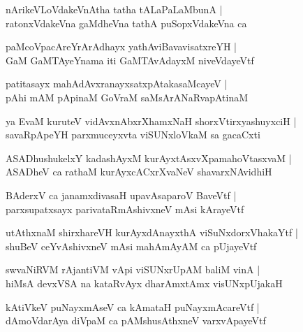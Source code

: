 \documentclass[twoside,12pt,openright]{book}
\newcounter{shloka}[chapter]
\begin{document}
\begin{shloka}%
nArikeVLoVdakeVnAtha tatha tALaPaLaMbunA |\\
ratonxVdakeVna gaMdheVna tathA puSopxVdakeVna ca 
\end{shloka}

\begin{shloka}%
paMcoVpacAreYrArAdhayx yathAviBavavisatxreYH |\\
GaM GaMTAyeYnama iti GaMTAvAdayxM niveVdayeVtf
\end{shloka}

\begin{shloka}%
patitasayx mahAdAvxranayxsatxpAtakasaMcayeV |\\
pAhi mAM pApinaM GoVraM saMsArANaRvapAtinaM 
\end{shloka}

\begin{shloka}%
ya EvaM kuruteV vidAvxnAbxrXhamxNaH shorxVtirxyashuyxciH |\\
savaRpApeYH parxmuceyxvta viSUNxloVkaM sa gacaCxti 
\end{shloka}

\begin{shloka}%
ASADhushukelxY kadashAyxM kurAyxtAsxvXpamahoVtasxvaM |\\
ASADheV ca rathaM kurAyxcACxrXvaNeV shavarxNAvidhiH
\end{shloka}

\begin{shloka}%
BAderxV ca janamxdivasaH upavAsaparoV BaveVtf |\\
parxsupatxsayx parivataRmAshivxneV mAsi kArayeVtf
\end{shloka}

\begin{shloka}%
utAthxnaM shirxhareVH kurAyxdAnayxthA viSuNxdorxVhakaYtf |\\
shuBeV ceYvAshivxneV mAsi mahAmAyAM ca pUjayeVtf
\end{shloka}

\begin{shloka}%
swvaNiRVM rAjantiVM vApi viSUNxrUpAM baliM vinA |\\
hiMsA devxVSA na kataRvAyx dharAmxtAmx visUNxpUjakaH 
\end{shloka}

\begin{shloka}%
kAtiVkeV puNayxmAseV ca kAmataH puNayxmAcareVtf |\\
dAmoVdarAya diVpaM ca pAMshusAthxneV varxvApayeVtf 
\end{shloka}
\end{document}
